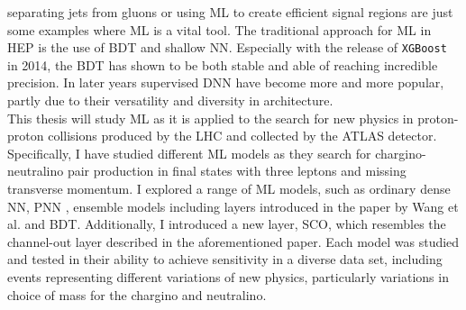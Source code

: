 separating jets from gluons \cite{PhysRevD.44.2025} or using \ac{ML} to create efficient signal regions \cite{baldi_searching_2014} are 
just some examples where \ac{ML} is a vital tool. The traditional approach for \ac{ML} in \ac{HEP} is the use of \acf{BDT} and shallow \acf{NN}. 
Especially with the release of \verb!XGBoost! \cite{XGB} in 2014, the \ac{BDT} has shown to be both stable and able of reaching incredible 
precision. In later years supervised \acf{DNN} have become more and more popular, partly due to their versatility and diversity in architecture.
\newline
\\
This thesis will study \ac{ML} as it is applied to the search for new physics in proton-proton collisions produced by the \ac{LHC} and collected by 
the \acs{ATLAS} detector. Specifically, I have studied different \ac{ML} models as they search for chargino-neutralino pair production in final states 
with three leptons and missing transverse momentum. I explored a range of \ac{ML} models, such as ordinary dense \acl{NN}, \acl{PNN} \cite{PNN},
ensemble models including layers introduced in the paper by Wang et al. \cite{wang_maxout_2013} and \acl{BDT}. Additionally, I introduced a new layer, \acl{SCO}, which 
resembles the channel-out layer described in the aforementioned paper. Each model was studied and tested in their ability to achieve sensitivity in a diverse 
data set, including events representing different variations of new physics, particularly variations in choice of mass for the chargino and neutralino.
\newpage
